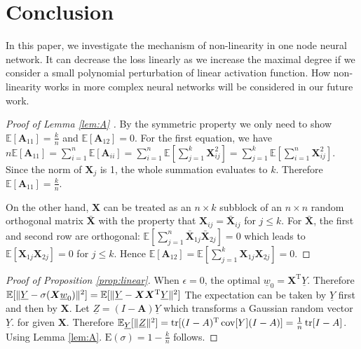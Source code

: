 \documentclass[conference]{IEEEtran}
\DeclarePairedDelimiter\norm{\lVert}{\rVert}
\def\E{\mathbb{E}}
\def\T{\mathrm{T}}
\DeclareMathOperator*{\Tr}{tr}
\DeclareMathOperator*{\Cov}{cov}
\begin{document}
\section{Conclusion}\label{sec:con}

In this paper, we investigate the mechanism of non-linearity in one node neural network. It can decrease the loss linearly as we increase the maximal degree if we consider a small polynomial perturbation of linear activation function. How non-linearity works in more complex neural networks will be considered in our future work. 

\appendix
\begin{proof}[Proof of Lemma \ref{lem:A} ]
By the symmetric property we only need to show $\E[\bm{A}_{11}] = \frac{k}{n}$ and
$\E[\bm{A}_{12}] = 0$. For the first equation, we have $n\E[\bm{A}_{11}]
= \sum_{i=1}^n \E[\bm{A}_{ii}] = \sum_{i=1}^n \E[ \sum_{j=1}^k \bm{X}^2_{ij}] =
\sum_{j=1}^k \E[\sum_{i=1}^n \bm{X}^2_{ij}]$. Since the norm of $\bm{X}_j$ is 1,
the whole summation evaluates to $k$. Therefore $\E[\bm{A}_{11}] = \frac{k}{n}$.

On the other hand, $\bm{X}$ can be treated as an $n\times k$ subblock of an $n\times n$
random orthogonal matrix $\bm{\bar{X}}$ with the property that $\bm{X}_{ij} = \bm{\bar{X}}_{ij}$
for $j\leq k$. For $\bm{\bar{X}}$, the first and second row are orthogonal:
 $\E[\sum_{j=1}^n \bm{\bar{X}}_{1j}\bm{\bar{X}}_{2j}] = 0 $ which leads to
 $\E[\bm{X}_{1j}\bm{X}_{2j}] = 0$ for $j \leq k$. Hence $\E[\bm{A}_{12}]=
 \E[\sum_{j=1}^k \bm{X}_{1j}\bm{X}_{2j}]=0$.
\end{proof}
\begin{proof}[Proof of Proposition \ref{prop:linear}]
    When $\epsilon = 0$, the optimal $\underline{w}_0 = \bm{X}^\T\underline{Y}$. Therefore
    $\E[\norm{\underline{Y} - \sigma(\bm{X} \underline{w}_0)}^2] = \E[\norm{\underline{Y}-\bm{X}\bm{X}^\T\underline{Y}}^2]$
    The expectation can be taken by $\underline{Y}$ first and then by $\bm{X}$.
    Let $\underline{Z} = (I-\bm{A}) \underline{Y}$ which transforms a Gaussian random vector $\underline{Y}$.
    for given $\bm{X}$. Therefore $\E_{\underline{Y}}[\norm{\underline{Z}}^2] = \Tr[(I-A)^\T\Cov[Y](I-A)]
    = \frac{1}{n}\Tr[I - A]$. Using Lemma \ref{lem:A}. $\mathrm{E}(\sigma) = 1 - \frac{k}{n}$ follows.
\end{proof}
\end{document}
